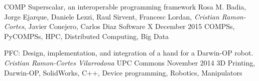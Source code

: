\begin{publications}
    \publication
        {COMP Superscalar, an interoperable programming framework}
        {Rosa M. Badia, Jorge Ejarque, Daniele Lezzi, Raul Sirvent, Francesc Lordan, \textit{Cristian Ramon-Cortes}, Javier Conejero, Carlos Diaz}
        {Software X}
        {December 2015}
        {COMPSs, PyCOMPSs, HPC, Distributed Computing, Big Data}
        {}
        
    \publication
        {PFC: Design, implementation, and integration of a hand for a Darwin-OP robot.}
        {\textit{Cristian Ramon-Cortes Vilarrodona}}
        {UPC Commons}
        {November 2014}
        {3D Printing, Darwin-OP, SolidWorks, C++, Device programming, Robotics, Manipulators}
        {}
    
\end{publications}
